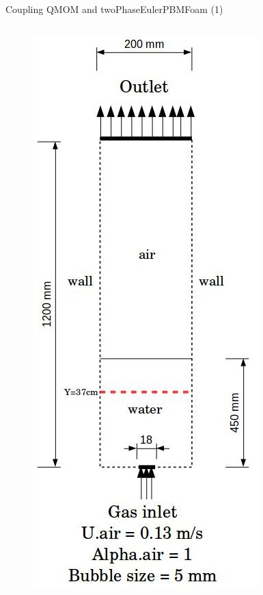 \documentclass{beamer}
\begin{document}
\begin{frame}{Coupling QMOM and twoPhaseEulerPBMFoam (1)}
\begin{columns}

\begin{column}{0.3\textwidth}

  \begin{figure}
  \includegraphics[width=0.8\linewidth]{y37.jpg}
  \end{figure} 


\end{column}
\end{columns}
\end{frame}
\end{document}
